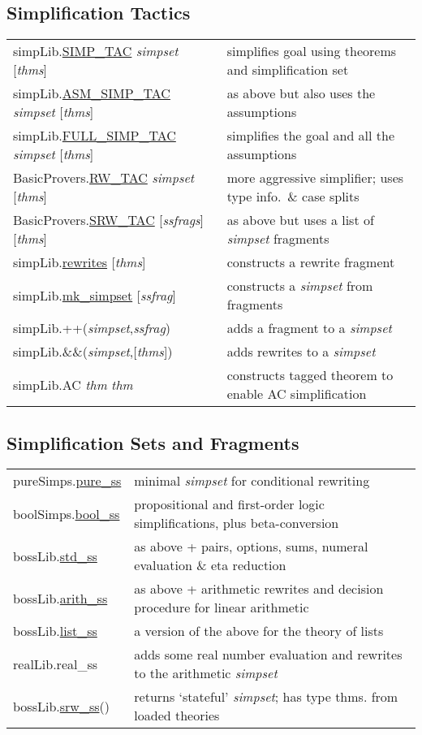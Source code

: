\documentclass[landscape,10pt]{article}
\newcommand{\hol}[2]{{\sffamily #1.\href{#1.#2.html}{#2}}}
\newcommand{\holnoref}[2]{{\sffamily #1.#2}}
\newcommand{\var}[1]{{\emph{#1}}}
\begin{document}
\begin{multicols}{2}
\subsection*{Simplification Tactics}
\begin{tabular}{ll}
\hol{simpLib}{SIMP_TAC} \var{simpset} [\var{thms}] & simplifies goal using theorems and simplification set \\
\hol{simpLib}{ASM_SIMP_TAC} \var{simpset} [\var{thms}] & as above but also uses the assumptions \\
\hol{simpLib}{FULL_SIMP_TAC} \var{simpset} [\var{thms}] & simplifies the goal and all the assumptions \\[4pt]
\hol{BasicProvers}{RW_TAC} \var{simpset} [\var{thms}] & more aggressive simplifier; uses type info.\ \& case splits \\
\hol{BasicProvers}{SRW_TAC} [\var{ssfrags}][\var{thms}] & as above but
uses a list of \emph{simpset} fragments  \\[4pt]
\hol{simpLib}{rewrites} [\var{thms}] & constructs a rewrite fragment \\
\hol{simpLib}{mk_simpset} [\var{ssfrag}] & constructs a \emph{simpset} from fragments \\
\holnoref{simpLib}{++}(\var{simpset},\var{ssfrag}) & adds a fragment to a \emph{simpset} \\ %
\holnoref{simpLib}{\&\&}(\var{simpset},[\var{thms}]) & adds rewrites to a \emph{simpset} \\ %
\holnoref{simpLib}{AC} \var{thm} \var{thm} & constructs tagged theorem
to enable AC simplification \\
\end{tabular}
\subsection*{Simplification Sets and Fragments}
\begin{tabular}{ll}
\hol{pureSimps}{pure_ss} & minimal \emph{simpset} for conditional rewriting \\
\hol{boolSimps}{bool_ss} & propositional and first-order logic simplifications, plus beta-conversion \\
\hol{bossLib}{std_ss} & as above + pairs, options, sums, numeral evaluation \& eta reduction \\
\hol{bossLib}{arith_ss} & as above + arithmetic rewrites and decision procedure for linear arithmetic \\
\hol{bossLib}{list_ss} & a version of the above for the theory of lists \\
\holnoref{realLib}{real_ss} & adds some real number evaluation and rewrites to the arithmetic \emph{simpset} \\
\hol{bossLib}{srw_ss}() & returns `stateful' \emph{simpset}; has type thms. from loaded theories
\end{tabular}


\end{multicols}
\end{document}
